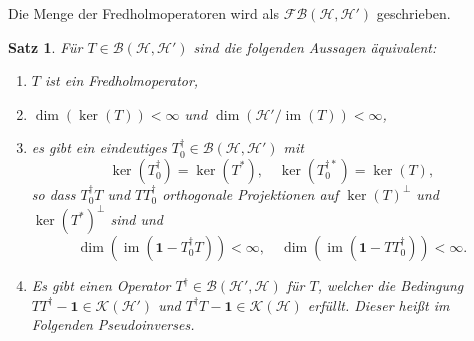 \documentclass[11pt, hidelinks]{article}
\newcommand{\h}{\mathcal{H}}
\newcommand{\im}{\operatorname{im}}
\numberwithin{conj}{section}
\newtheorem{theorem}[conj]{Satz}
\begin{document}
Die Menge der Fredholmoperatoren wird als $\mathcal{FB}(\h,\h')$ geschrieben.

\begin{theorem}
    \label{fredholm}
    Für $T \in \mathcal{B}(\h,\h')$ sind die folgenden Aussagen äquivalent:
    \begin{enumerate}
        \item $T$ ist ein Fredholmoperator,
        \item $ \dim(\ker(T)) < \infty$ und $\dim(\h' / \im(T)) < \infty$,
        \item es gibt ein eindeutiges $T^\dagger_0 \in \mathcal{B}(\h,\h')$ mit
        \begin{equation}
            \ker(T^\dagger_0) = \ker(T^\ast), \quad \ker(T^{\dagger\ast}_0) = \ker(T),
        \end{equation}
        so dass $T^\dagger_0T$ und $TT^\dagger_0$ orthogonale Projektionen auf $\ker(T)^\perp$ und $\ker(T^\ast)^\perp$ sind und
        \begin{equation}
            \dim(\im(\mathbf{1}-T^\dagger_0T)) < \infty, \quad \dim(\im(\mathbf{1}-TT^\dagger_0)) < \infty.
        \end{equation}
        \item Es gibt einen Operator $T^\dagger\in \mathcal{B}(\h',\h)$ für $T$, welcher die Bedingung $TT^\dagger-\mathbf{1} \in \mathcal{K}(\h')$ und $T^\dagger T-\mathbf{1} \in \mathcal{K}(\h)$ erfüllt. Dieser heißt im Folgenden Pseudoinverses.
    \end{enumerate}
\end{theorem}
\end{document}
